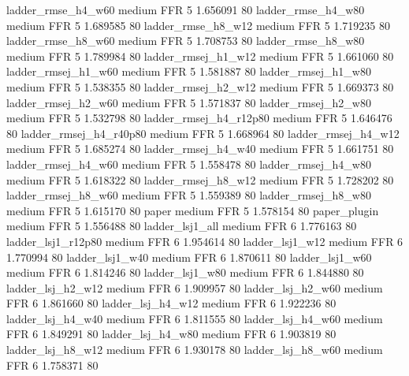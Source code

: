     ladder_rmse_h4_w60     medium      FFR                 5 1.656091 80
    ladder_rmse_h4_w80     medium      FFR                 5 1.689585 80
    ladder_rmse_h8_w12     medium      FFR                 5 1.719235 80
    ladder_rmse_h8_w60     medium      FFR                 5 1.708753 80
    ladder_rmse_h8_w80     medium      FFR                 5 1.789984 80
   ladder_rmsej_h1_w12     medium      FFR                 5 1.661060 80
   ladder_rmsej_h1_w60     medium      FFR                 5 1.581887 80
   ladder_rmsej_h1_w80     medium      FFR                 5 1.538355 80
   ladder_rmsej_h2_w12     medium      FFR                 5 1.669373 80
   ladder_rmsej_h2_w60     medium      FFR                 5 1.571837 80
   ladder_rmsej_h2_w80     medium      FFR                 5 1.532798 80
ladder_rmsej_h4_r12p80     medium      FFR                 5 1.646476 80
ladder_rmsej_h4_r40p80     medium      FFR                 5 1.668964 80
   ladder_rmsej_h4_w12     medium      FFR                 5 1.685274 80
   ladder_rmsej_h4_w40     medium      FFR                 5 1.661751 80
   ladder_rmsej_h4_w60     medium      FFR                 5 1.558478 80
   ladder_rmsej_h4_w80     medium      FFR                 5 1.618322 80
   ladder_rmsej_h8_w12     medium      FFR                 5 1.728202 80
   ladder_rmsej_h8_w60     medium      FFR                 5 1.559389 80
   ladder_rmsej_h8_w80     medium      FFR                 5 1.615170 80
                 paper     medium      FFR                 5 1.578154 80
          paper_plugin     medium      FFR                 5 1.556488 80
       ladder_lsj1_all     medium      FFR                 6 1.776163 80
    ladder_lsj1_r12p80     medium      FFR                 6 1.954614 80
       ladder_lsj1_w12     medium      FFR                 6 1.770994 80
       ladder_lsj1_w40     medium      FFR                 6 1.870611 80
       ladder_lsj1_w60     medium      FFR                 6 1.814246 80
       ladder_lsj1_w80     medium      FFR                 6 1.844880 80
     ladder_lsj_h2_w12     medium      FFR                 6 1.909957 80
     ladder_lsj_h2_w60     medium      FFR                 6 1.861660 80
     ladder_lsj_h4_w12     medium      FFR                 6 1.922236 80
     ladder_lsj_h4_w40     medium      FFR                 6 1.811555 80
     ladder_lsj_h4_w60     medium      FFR                 6 1.849291 80
     ladder_lsj_h4_w80     medium      FFR                 6 1.903819 80
     ladder_lsj_h8_w12     medium      FFR                 6 1.930178 80
     ladder_lsj_h8_w60     medium      FFR                 6 1.758371 80

